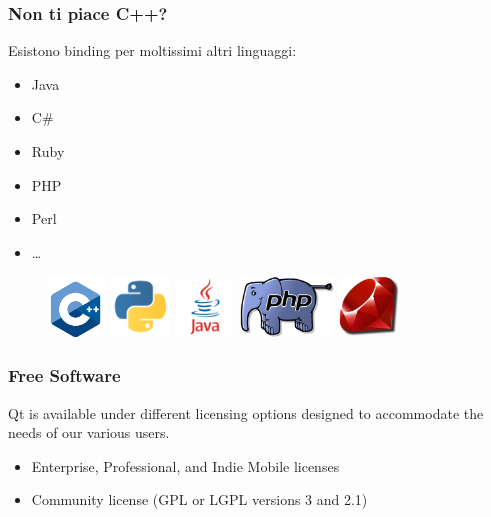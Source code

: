 \documentclass{beamer}
\begin{document}
\begin{frame}
	\frametitle{Non ti piace C++?}
	\begin{block}{}
		Esistono binding per moltissimi altri linguaggi:
		\begin{itemize}
			\item Java
			\item C\#
			\item Ruby
			\item PHP
			\item Perl
			\item \dots
		\end{itemize}
	\end{block}
	\vspace{0.5cm}
	\begin{figure}
		\includegraphics[height=1.6cm]{images/cplusplus.png}
		\qquad
		\includegraphics[height=1.6cm]{images/python.png}
		\qquad
		\includegraphics[height=1.6cm]{images/java.png}
		\qquad
		\includegraphics[height=1.6cm]{images/php.png}
		\qquad
		\includegraphics[height=1.6cm]{images/ruby.png}
	\end{figure}	
\end{frame}

\begin{frame}
	\frametitle{Free Software}
	Qt is available under different licensing options designed to accommodate the needs of our various users.
	\begin{itemize}
		\item Enterprise, Professional, and Indie Mobile licenses
		\item Community license (GPL or LGPL versions 3 and 2.1)
	\end{itemize}
\end{frame}
\end{document}
